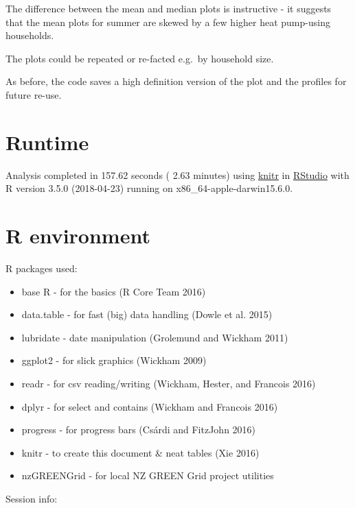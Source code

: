 \documentclass[]{article}
\providecommand{\tightlist}{%
  \setlength{\itemsep}{0pt}\setlength{\parskip}{0pt}}
\begin{document}
The difference between the mean and median plots is instructive - it
suggests that the mean plots for summer are skewed by a few higher heat
pump-using households.

The plots could be repeated or re-facted e.g.~by household size.

As before, the code saves a high definition version of the plot and the
profiles for future re-use.

\section{Runtime}\label{runtime}

Analysis completed in 157.62 seconds ( 2.63 minutes) using
\href{https://cran.r-project.org/package=knitr}{knitr} in
\href{http://www.rstudio.com}{RStudio} with R version 3.5.0 (2018-04-23)
running on x86\_64-apple-darwin15.6.0.

\section{R environment}\label{r-environment}

R packages used:

\begin{itemize}
\tightlist
\item
  base R - for the basics (R Core Team 2016)
\item
  data.table - for fast (big) data handling (Dowle et al. 2015)
\item
  lubridate - date manipulation (Grolemund and Wickham 2011)
\item
  ggplot2 - for slick graphics (Wickham 2009)
\item
  readr - for csv reading/writing (Wickham, Hester, and Francois 2016)
\item
  dplyr - for select and contains (Wickham and Francois 2016)
\item
  progress - for progress bars (Csárdi and FitzJohn 2016)
\item
  knitr - to create this document \& neat tables (Xie 2016)
\item
  nzGREENGrid - for local NZ GREEN Grid project utilities
\end{itemize}

Session info:
\end{document}

